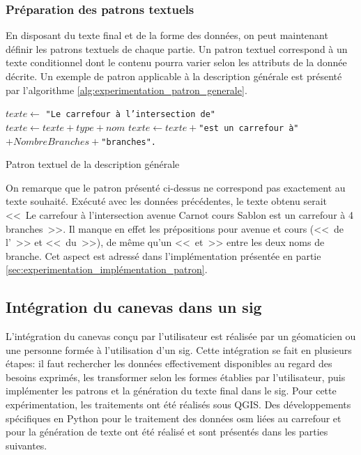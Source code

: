\subsubsection{Préparation des patrons textuels}

\label{sec:experimentation_preparation_patron}

En disposant du texte final et de la forme des données, on peut maintenant définir les patrons textuels de chaque partie. Un patron textuel correspond à un texte conditionnel dont le contenu pourra varier selon les attributs de la donnée décrite. Un exemple de patron applicable à la description générale est présenté par l'algorithme \ref{alg:experimentation_patron_generale}.

\begin{algorithm}
    \vspace{0.3cm}
    $texte \leftarrow $ \texttt{"Le carrefour à l'intersection de"}\\
     {
        $texte \leftarrow texte + type + nom$
    }
    $texte \leftarrow texte +$\texttt{"est un carrefour à"}$+ NombreBranches+$\texttt{"branches".}
    \vspace{0.3cm}
    \caption[Patron textuel de la description générale]{Patron textuel de la description générale}

\label{alg:experimentation_patron_generale}
\end{algorithm}

On remarque que le patron présenté ci-dessus ne correspond pas exactement au texte souhaité. Exécuté avec les données précédentes, le texte obtenu serait <<~Le carrefour à l'intersection avenue Carnot cours Sablon est un carrefour à 4 branches~>>. Il manque en effet les prépositions pour avenue et cours (<<~de l'~>> et <<~du~>>), de même qu'un <<~et~>> entre les deux noms de branche. Cet aspect est adressé dans l'implémentation présentée en partie \ref{sec:experimentation_implémentation_patron}.

\subsection{Intégration du canevas dans un \gls{sig}}

L'intégration du canevas conçu par l'utilisateur est réalisée par un géomaticien ou une personne formée à l'utilisation d'un \gls{sig}. Cette intégration se fait en plusieurs étapes: il faut rechercher les données effectivement disponibles au regard des besoins exprimés, les transformer selon les formes établies par l'utilisateur, puis implémenter les patrons et la génération du texte final dans le \gls{sig}. Pour cette expérimentation, les traitements ont été réalisés sous QGIS. Des développements spécifiques en Python pour le traitement des données \gls{osm} liées au carrefour et pour la génération de texte ont été réalisé et sont présentés dans les parties suivantes.

